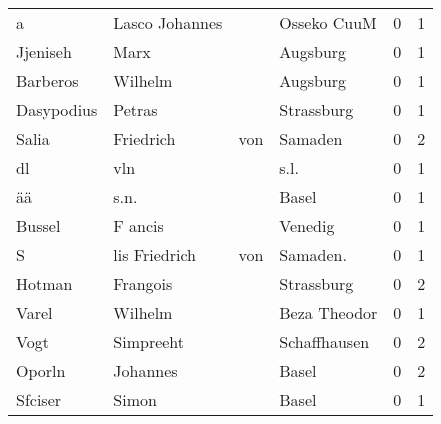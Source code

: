 \begin{tabular}{llllrr}
                        a &                     Lasco Johannes &             &                                 Osseko CuuM &          0 &         1 \\
                 Jjeniseh &                               Marx &             &                                    Augsburg &          0 &         1 \\
                 Barberos &                            Wilhelm &             &                                    Augsburg &          0 &         1 \\
               Dasypodius &                             Petras &             &                                  Strassburg &          0 &         1 \\
                    Salia &                          Friedrich &         von &                                     Samaden &          0 &         2 \\
                       dl &                                vln &             &                                        s.l. &          0 &         1 \\
                       ää &                               s.n. &             &                                       Basel &          0 &         1 \\
                   Bussel &                            F ancis &             &                                     Venedig &          0 &         1 \\
                        S &                      lis Friedrich &         von &                                   Samaden.  &          0 &         1 \\
                   Hotman &                           Frangois &             &                                  Strassburg &          0 &         2 \\
                    Varel &                            Wilhelm &             &                                Beza Theodor &          0 &         1 \\
                     Vogt &                          Simpreeht &             &                                Schaffhausen &          0 &         2 \\
                   Oporln &                           Johannes &             &                                       Basel &          0 &         2 \\
                  Sfciser &                              Simon &             &                                       Basel &          0 &         1 \\

\end{tabular}
